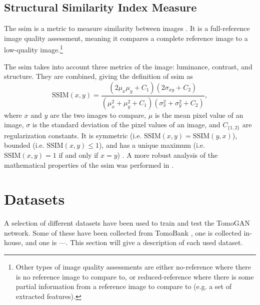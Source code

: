 
\subsection{Structural Similarity Index Measure}
The \gls{ssim} is a metric to measure similarity between images \cite{ssim}. It is a full-reference image quality assessment, meaning it compares a complete reference image to a low-quality image.\footnote{Other types of image quality assessments are either no-reference where there is no reference image to compare to, or reduced-reference where there is some partial information from a reference image to compare to (e.g. a set of extracted features)\cite{ssim}. }


The \gls{ssim} takes into account three metrics of the image: luminance, contrast, and structure. They are combined, giving the definition of \gls{ssim} as \cite{ssim}
\begin{equation}
    \label{eq:ssim}
    \text{SSIM}\left(x,y\right) = \frac{\left( 2\mu_x \mu_y + C_1 \right) \left( 2\sigma_{xy} + C_2 \right)}{\left( \mu_x^2 + \mu_y^2 + C_1 \right) \left( \sigma_x^2 + \sigma_y^2 + C_2 \right)},
\end{equation}
where $x$ and $y$ are the two images to compare, $\mu$ is the mean pixel value of an image, $\sigma$ is the standard deviation of the pixel values of an image, and $C_{\{1,2\}}$ are regularization constants. It is symmetric (i.e. $\text{SSIM}\left(x,y\right) = \text{SSIM}\left(y,x\right)$), bounded (i.e. $\text{SSIM}\left(x,y\right) \leq 1$), and has a unique maximum (i.e. $\text{SSIM}\left(x,y\right) = 1$ if and only if $x = y$) \cite{ssim}. A more robust analysis of the mathematical properties of the \gls{ssim} was performed in \cite{6059504}.


\section{Datasets}
\label{sec:method:datasets}
A selection of different datasets have been used to train and test the TomoGAN network. Some of these have been collected from TomoBank \cite{TomoBank}, one is collected in-house, and one is ---. This section will give a description of each used dataset. 

